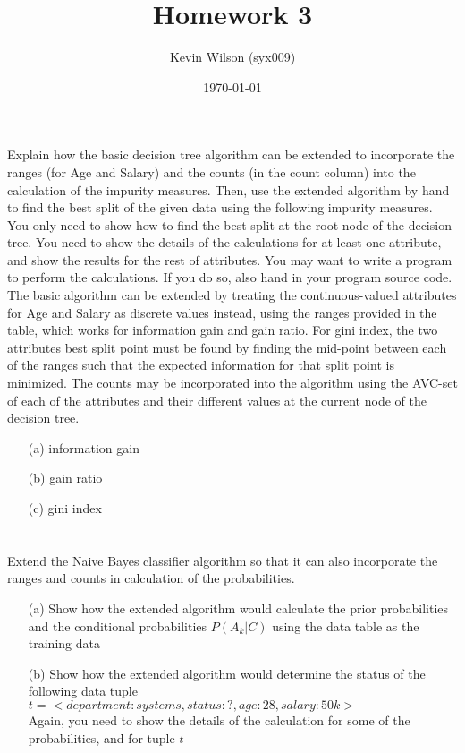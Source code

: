 \documentclass{scrartcl}
\begin{document}
\setlength\parindent{0pt}
\author{Kevin Wilson (syx009)}
\title{Homework 3}
\date{\today}
\maketitle

\section{}
Explain how the basic decision tree algorithm can be extended to incorporate the ranges (for Age and Salary) and the counts (in the count column) into the calculation of the impurity measures.  Then, use the extended algorithm by hand to find the best split of the given data using the following impurity measures.  You only need to show how to find the best split at the root node of the decision tree.  You need to show the details of the calculations for at least one attribute, and show the results for the rest of attributes.  You may want to write a program to perform the calculations. If you do so, also hand in your program source code.\\

The basic algorithm can be extended by treating the continuous-valued attributes for Age and Salary as discrete values instead, using the ranges provided in the table, which works for information gain and gain ratio. For gini index, the two attributes best split point must be found by finding the mid-point between each of the ranges such that the expected information for that split point is minimized. The counts may be incorporated into the algorithm using the AVC-set of each of the attributes and their different values at the current node of the decision tree.

\begin{enumerate}
  \item[(a)] information gain
  \item[(b)] gain ratio
  \item[(c)] gini index
\end{enumerate}

\section{}
Extend the Naive Bayes classifier algorithm so that it can also incorporate the ranges and counts in calculation of the probabilities.

\begin{enumerate}
  \item[(a)] Show how the extended algorithm would calculate the prior probabilities and the conditional probabilities $P(A_k | C)$ using the data table as the training data
  \item[(b)] Show how the extended algorithm would determine the status of the following data tuple\\
  
  $t = <department: systems, status: ?, age: 28, salary: 50k>$\\
  
  Again, you need to show the details of the calculation for some of the probabilities, and for tuple $t$
\end{enumerate}
\end{document}
